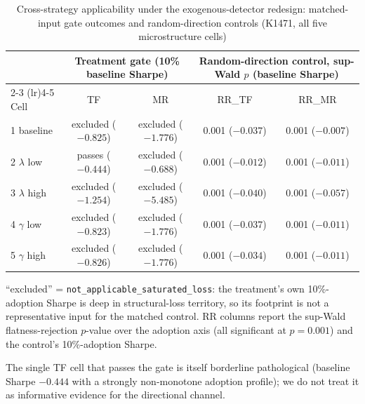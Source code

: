 \documentclass[12pt,a4paper]{article}
\begin{document}
\begin{table}[H]
\centering
\caption{Cross-strategy applicability under the exogenous-detector redesign: matched-input gate outcomes and random-direction controls (K1471, all five microstructure cells)}
\label{tab:tfmr_gate}
\begin{threeparttable}
\small
\begin{tabular}{lcccc}
\toprule
& \multicolumn{2}{c}{Treatment gate (10\% baseline Sharpe)} & \multicolumn{2}{c}{Random-direction control, sup-Wald $p$ (baseline Sharpe)} \\
\cmidrule(lr){2-3} \cmidrule(lr){4-5}
Cell & TF & MR & RR\_TF & RR\_MR \\
\midrule
1 baseline & excluded ($-0.825$) & excluded ($-1.776$) & 0.001 ($-0.037$) & 0.001 ($-0.007$) \\
2 $\lambda$ low & passes ($-0.444$)\tnote{a} & excluded ($-0.688$) & 0.001 ($-0.012$) & 0.001 ($-0.011$) \\
3 $\lambda$ high & excluded ($-1.254$) & excluded ($-5.485$) & 0.001 ($-0.040$) & 0.001 ($-0.057$) \\
4 $\gamma$ low & excluded ($-0.823$) & excluded ($-1.776$) & 0.001 ($-0.037$) & 0.001 ($-0.011$) \\
5 $\gamma$ high & excluded ($-0.826$) & excluded ($-1.776$) & 0.001 ($-0.034$) & 0.001 ($-0.011$) \\
\bottomrule
\end{tabular}
\begin{tablenotes}
\footnotesize
\item ``excluded'' = \texttt{not\_applicable\_saturated\_loss}: the treatment's own 10\%-adoption Sharpe is deep in structural-loss territory, so its footprint is not a representative input for the matched control. RR columns report the sup-Wald flatness-rejection $p$-value over the adoption axis (all significant at $p = 0.001$) and the control's 10\%-adoption Sharpe.
\item[a] The single TF cell that passes the gate is itself borderline pathological (baseline Sharpe $-0.444$ with a strongly non-monotone adoption profile); we do not treat it as informative evidence for the directional channel.
\end{tablenotes}
\end{threeparttable}
\end{table}
\end{document}
